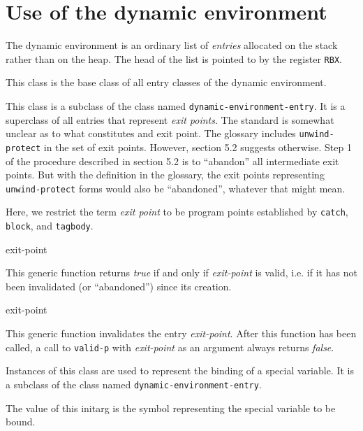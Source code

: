 \section{Use of the dynamic environment}

The dynamic environment is an ordinary list of \emph{entries}
allocated on the stack rather than on the heap.  The head of the list
is pointed to by the register \texttt{RBX}.


This class is the base class of all entry classes of the dynamic
environment.


This class is a subclass of the class named
\texttt{dynamic-environment-entry}.  It is a superclass of all entries
that represent \emph{exit points}.  The \commonlisp{} standard is
somewhat unclear as to what constitutes and exit point.  The glossary
includes \texttt{unwind-protect} in the set of exit points.  However,
section 5.2 suggests otherwise.  Step 1 of the procedure described in
section 5.2 is to ``abandon'' all intermediate exit points.  But with
the definition in the glossary, the exit points representing
\texttt{unwind-protect} forms would also be ``abandoned'', whatever
that might mean.

Here, we restrict the term \emph{exit point} to be program points
established by \texttt{catch}, \texttt{block}, and \texttt{tagbody}.

 {exit-point}

This generic function returns \textit{true} if and only if
\textit{exit-point} is valid, i.e. if it has not been invalidated (or
``abandoned'') since its creation.

 {exit-point}

This generic function invalidates the entry \textit{exit-point}.
After this function has been called, a call to \texttt{valid-p} with
\textit{exit-point} as an argument always returns \textit{false}.


Instances of this class are used to represent the binding of a special
variable.  It is a subclass of the class named
\texttt{dynamic-environment-entry}.


The value of this initarg is the symbol representing the special
variable to be bound.

